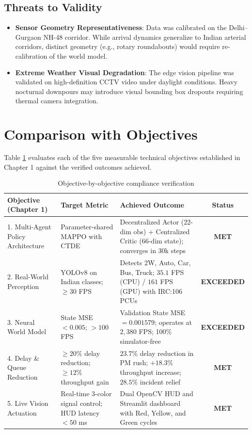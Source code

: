 \subsection{Threats to Validity}
\begin{itemize}
    \item \textbf{Sensor Geometry Representativeness}: Data was calibrated on the Delhi--Gurgaon NH-48 corridor. While arrival dynamics generalize to Indian arterial corridors, distinct geometry (e.g., rotary roundabouts) would require re-calibration of the world model.
    \item \textbf{Extreme Weather Visual Degradation}: The edge vision pipeline was validated on high-definition CCTV video under daylight conditions. Heavy nocturnal downpours may introduce visual bounding box dropouts requiring thermal camera integration.
\end{itemize}

\section{Comparison with Objectives}
\label{sec:ch5_obj_comparison}
Table \ref{tab:ch5_objectives_compliance} evaluates each of the five measurable technical objectives established in Chapter 1 against the verified outcomes achieved.

\begin{table}[htbp]
\centering
\small
\caption{Objective-by-objective compliance verification}
\label{tab:ch5_objectives_compliance}
\begin{tabularx}{\textwidth}{|p{3.2cm}|p{3.8cm}|X|c|}
\hline
\textbf{Objective (Chapter 1)} & \textbf{Target Metric} & \textbf{Achieved Outcome} & \textbf{Status} \\ \hline
1. Multi-Agent Policy Architecture & Parameter-shared MAPPO with CTDE & Decentralized Actor (22-dim obs) + Centralized Critic (66-dim state); converges in 30k steps & \textbf{MET} \\ \hline
2. Real-World Perception & YOLOv8 on Indian classes; $\ge 30$ FPS & Detects 2W, Auto, Car, Bus, Truck; $35.1$ FPS (CPU) / $161$ FPS (GPU) with IRC:106 PCUs & \textbf{EXCEEDED} \\ \hline
3. Neural World Model & State MSE $< 0.005$; $> 100$ FPS & Validation State MSE $= 0.001579$; operates at $2,380$ FPS; 100\% simulator-free & \textbf{EXCEEDED} \\ \hline
4. Delay \& Queue Reduction & $\ge 20\%$ delay reduction; $\ge 12\%$ throughput gain & $23.7\%$ delay reduction in PM rush; $+18.3\%$ throughput increase; $28.5\%$ incident relief & \textbf{MET} \\ \hline
5. Live Vision Actuation & Real-time 3-color signal control; HUD latency $< 50$ ms & Dual OpenCV HUD and Streamlit dashboard with Red, Yellow, and Green cycles & \textbf{MET} \\ \hline
\end{tabularx}
\end{table}

